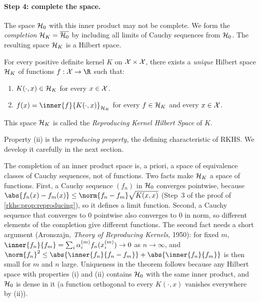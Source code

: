 \begin{notechapter}
\paragraph{Step 4: complete the space.} The space $\mathcal{H}_0$ with this inner
product may not be complete. We form the \emph{completion} $\mathcal{H}_K =
\overline{\mathcal{H}_0}$ by including all limits of Cauchy sequences from
$\mathcal{H}_0$. The resulting space $\mathcal{H}_K$ is a Hilbert space.

\begin{theorem}
\label{rkhs:thm:moore_aronszajn}
For every positive definite kernel $K$ on $\mathcal{X} \times \mathcal{X}$, there exists a
\emph{unique} Hilbert space $\mathcal{H}_K$ of functions $f: \X \to \R$ such
that:
\begin{enumerate}[label=(\roman*)]
  \item $K(\cdot, x) \in \mathcal{H}_K$ for every $x \in \mathcal{X}$.
  \item $f(x) = \inner{f}{K(\cdot, x)}_{\hk}$ for every $f \in \mathcal{H}_K$ and
  every $x \in \mathcal{X}$.
\end{enumerate}
This space $\mathcal{H}_K$ is called the \emph{Reproducing Kernel Hilbert Space} of $K$.
\end{theorem}

Property (ii) is the \emph{reproducing property}, the defining
characteristic of RKHS. We develop it carefully in the next section.

\begin{remark}
The completion of an inner product space is, a priori, a space of equivalence classes of Cauchy sequences, not of functions. Two facts make $\mathcal{H}_K$ a space of functions. First, a Cauchy sequence $(f_n)$ in $\mathcal{H}_0$ converges pointwise, because $\abs{f_n(x) - f_m(x)} \le \norm{f_n - f_m}\sqrt{K(x,x)}$ (Step~3 of the proof of \cref{rkhs:prop:reproducing}), so it defines a limit function. Second, a Cauchy sequence that converges to $0$ pointwise also converges to $0$ in norm, so different elements of the completion give different functions. The second fact needs a short argument (Aronszajn, \emph{Theory of Reproducing Kernels}, 1950): for fixed $m$, $\inner{f_n}{f_m} = \sum_i\alpha_i^{(m)}f_n(x_i^{(m)}) \to 0$ as $n \to \infty$, and $\norm{f_n}^2 \le \abs{\inner{f_n}{f_n - f_m}} + \abs{\inner{f_n}{f_m}}$ is then small for $m$ and $n$ large. Uniqueness in the theorem follows because any Hilbert space with properties (i) and (ii) contains $\mathcal{H}_0$ with the same inner product, and $\mathcal{H}_0$ is dense in it (a function orthogonal to every $K(\cdot, x)$ vanishes everywhere by (ii)).
\end{remark}



\end{notechapter}

